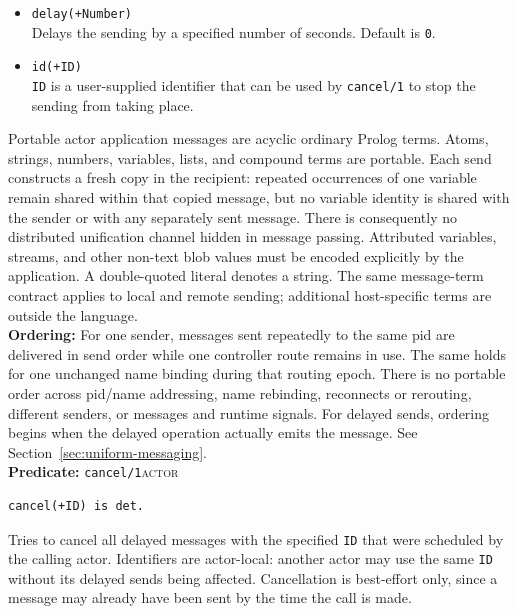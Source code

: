 \begin{itemize}
\item
  \texttt{delay(\allowbreak{}+Number)}\\
  Delays the sending by a specified number of seconds. Default is \texttt{0}.
\item
  \texttt{id(\allowbreak{}+ID)}\\
  \texttt{ID} is a user-supplied identifier that can be used by
  \texttt{cancel/\allowbreak{}1} to stop the sending from taking place.
\end{itemize}

\noindent Portable actor application messages are acyclic ordinary Prolog
terms. Atoms, strings, numbers, variables, lists, and compound terms are
portable. Each send constructs a fresh copy in the recipient: repeated
occurrences of one variable remain shared within that copied message, but no
variable identity is shared with the sender or with any separately sent
message. There is consequently no distributed unification channel hidden in
message passing. Attributed variables, streams, and other non-text blob values
must be encoded explicitly by the application. A double-quoted literal denotes
a string. The same message-term contract applies to local and remote
sending; additional host-specific terms are outside the language.\\

\smallskip
\noindent \textbf{Ordering:} For one sender, messages sent repeatedly to the
same pid are delivered in send order while one controller route remains in
use. The same holds for one unchanged name binding during that routing epoch.
There is no portable order across pid/name addressing, name rebinding,
reconnects or rerouting, different senders, or messages and runtime signals.
For delayed sends, ordering begins when the delayed operation actually emits
the message. See Section~\ref{sec:uniform-messaging}.\\


\noindent \textbf{Predicate:} \texttt{cancel/\allowbreak{}1}\hfill\textsc{actor}

\begin{verbatim}
cancel(+ID) is det.
\end{verbatim}

\noindent Tries to cancel all delayed messages with the specified \texttt{ID}
that were scheduled by the calling actor. Identifiers are actor-local:
another actor may use the same \texttt{ID} without its delayed sends being
affected. Cancellation is best-effort only, since a message may already have
been sent by the time the call is made.\\


